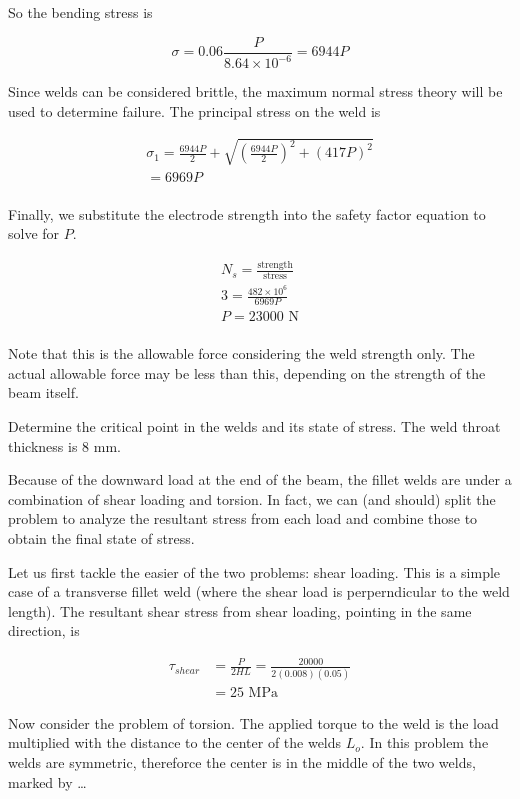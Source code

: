 \documentclass[a4paper,openany,12pt]{book}
\begin{document}
{{So the bending stress is

$$\sigma  = 0.06\frac{P}{8.64 \times 10^{-6}} = 6944P$$

Since welds can be considered brittle, the maximum normal stress theory
will be used to determine failure. The principal stress on the weld is

$$\begin{gathered}
      \sigma _1 = \frac{6944P}{2} + \sqrt {\left( \frac{6944P}{2} \right)^2 + (417P)^2}  \\ 
      = 6969P \\ 
    \end{gathered}$$

Finally, we substitute the electrode strength into the safety factor
equation to solve for \(P\).

$$\begin{gathered}
      N_s = \frac{\text{strength}}{\text{stress}} \\ 
      3 = \frac{482 \times 10^6}{6969P} \\ 
      P = 23000 \text{ N} \\ 
    \end{gathered}$$

Note that this is the allowable force considering the weld strength
only. The actual allowable force may be less than this, depending on the
strength of the beam itself.

Determine the critical point in the welds and its state of stress. The
weld throat thickness is 8 mm.


Because of the downward load at the end of the beam, the fillet welds
are under a combination of shear loading and torsion. In fact, we can
(and should) split the problem to analyze the resultant stress from each
load and combine those to obtain the final state of stress.

Let us first tackle the easier of the two problems: shear loading. This
is a simple case of a transverse fillet weld (where the shear load is
perperndicular to the weld length). The resultant shear stress from
shear loading, pointing in the same direction, is

$$\begin{aligned}
    \tau_{shear} &= \frac{P}{2HL} = \frac{20000}{2(0.008)(0.05)} \\
                 &= 25 \text{ MPa}
  \end{aligned}$$

Now consider the problem of torsion. The applied torque to the weld is
the load multiplied with the distance to the center of the welds \(L_o\).
In this problem the welds are symmetric, thereforce the center is in the
middle of the two welds, marked by \ldots{}

}}
\end{document}

